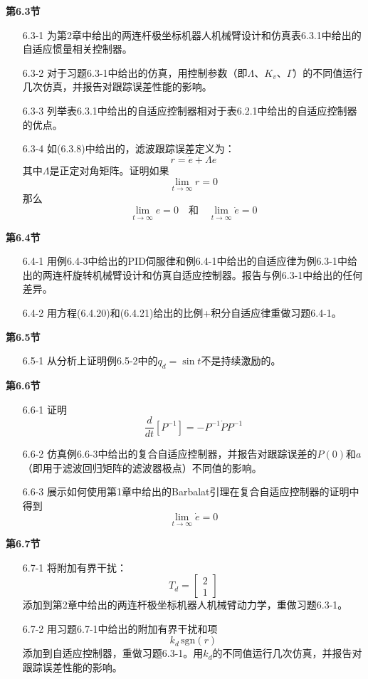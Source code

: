 \documentclass[12pt,a4paper]{ctexart}
\begin{document}
\textbf{第6.3节}

\begin{enumerate}
\item[6.3-1] 为第2章中给出的两连杆极坐标机器人机械臂设计和仿真表6.3.1中给出的自适应惯量相关控制器。

\item[6.3-2] 对于习题6.3-1中给出的仿真，用控制参数（即$\Lambda$、$K_v$、$\Gamma$）的不同值运行几次仿真，并报告对跟踪误差性能的影响。

\item[6.3-3] 列举表6.3.1中给出的自适应控制器相对于表6.2.1中给出的自适应控制器的优点。

\item[6.3-4] 如(6.3.8)中给出的，滤波跟踪误差定义为：
\[
r = \dot{e} + \Lambda e
\]
其中$\Lambda$是正定对角矩阵。证明如果
\[
\lim_{t \to \infty} r = 0
\]
那么
\[
\lim_{t \to \infty} e = 0 \quad \text{和} \quad \lim_{t \to \infty} \dot{e} = 0
\]
\end{enumerate}

\textbf{第6.4节}

\begin{enumerate}
\item[6.4-1] 用例6.4-3中给出的PID伺服律和例6.4-1中给出的自适应律为例6.3-1中给出的两连杆旋转机械臂设计和仿真自适应控制器。报告与例6.3-1中给出的任何差异。

\item[6.4-2] 用方程(6.4.20)和(6.4.21)给出的比例+积分自适应律重做习题6.4-1。
\end{enumerate}

\textbf{第6.5节}

\begin{enumerate}
\item[6.5-1] 从分析上证明例6.5-2中的$q_d = \sin t$不是持续激励的。
\end{enumerate}

\textbf{第6.6节}

\begin{enumerate}
\item[6.6-1] 证明
\[
\frac{d}{dt}[P^{-1}] = -P^{-1}\dot{P}P^{-1}
\]

\item[6.6-2] 仿真例6.6-3中给出的复合自适应控制器，并报告对跟踪误差的$P(0)$和$a$（即用于滤波回归矩阵的滤波器极点）不同值的影响。

\item[6.6-3] 展示如何使用第1章中给出的Barbalat引理在复合自适应控制器的证明中得到
\[
\lim_{t \to \infty} \dot{e} = 0
\]
\end{enumerate}

\textbf{第6.7节}

\begin{enumerate}
\item[6.7-1] 将附加有界干扰：
\[
T_d = \begin{bmatrix} 2 \\ 1 \end{bmatrix}
\]
添加到第2章中给出的两连杆极坐标机器人机械臂动力学，重做习题6.3-1。

\item[6.7-2] 用习题6.7-1中给出的附加有界干扰和项
\[
k_d\, \text{sgn}(r)
\]
添加到自适应控制器，重做习题6.3-1。用$k_d$的不同值运行几次仿真，并报告对跟踪误差性能的影响。
\end{enumerate}

\ifstandalone
  
\end{document}
